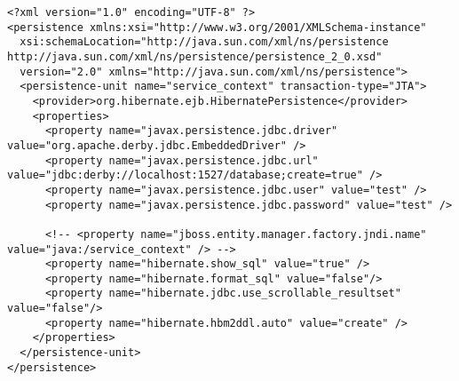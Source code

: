 \renewcommand{\lstlistingname}{Código}             
\begin{lstlisting}[caption=Arquivo persistence.xml., label=fig:persistence_proj] 
<?xml version="1.0" encoding="UTF-8" ?>
<persistence xmlns:xsi="http://www.w3.org/2001/XMLSchema-instance"
  xsi:schemaLocation="http://java.sun.com/xml/ns/persistence http://java.sun.com/xml/ns/persistence/persistence_2_0.xsd"
  version="2.0" xmlns="http://java.sun.com/xml/ns/persistence">
  <persistence-unit name="service_context" transaction-type="JTA">
	<provider>org.hibernate.ejb.HibernatePersistence</provider>	
    <properties>
      <property name="javax.persistence.jdbc.driver" value="org.apache.derby.jdbc.EmbeddedDriver" />
      <property name="javax.persistence.jdbc.url" value="jdbc:derby://localhost:1527/database;create=true" />
      <property name="javax.persistence.jdbc.user" value="test" />
      <property name="javax.persistence.jdbc.password" value="test" />

	  <!-- <property name="jboss.entity.manager.factory.jndi.name" value="java:/service_context" /> -->
	  <property name="hibernate.show_sql" value="true" />	
  	  <property name="hibernate.format_sql" value="false"/>
  	  <property name="hibernate.jdbc.use_scrollable_resultset" value="false"/>	
  	  <property name="hibernate.hbm2ddl.auto" value="create" /> 
    </properties>
  </persistence-unit>
</persistence>
\end{lstlisting}

